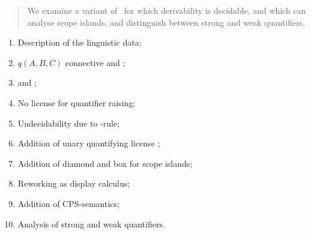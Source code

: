 \documentclass{llncs}
\begin{document}
\begin{abstract}
  We examine a variant of  \NLIBC\ for
  which derivability is decidable, and which can analyse scope
  islands, and distinguish between strong and weak quantifiers.
\end{abstract}

\begin{enumerate}\color{red}
\item Description of the linguistic data;
\item $q(A,B,C)$ connective and \citet{moortgat1996};
\item \citet{barker2007} and \NLIBC;
\item No license for quantifier raising;
\item Undecidability due to \I-rule;
\item Addition of unary quantifying license \Q;
\item Addition of diamond and box for scope islands;
\item Reworking as display calculus;
\item Addition of CPS-semantics;
\item Analysis of strong and weak quantifiers.
\end{enumerate}




\end{document}
